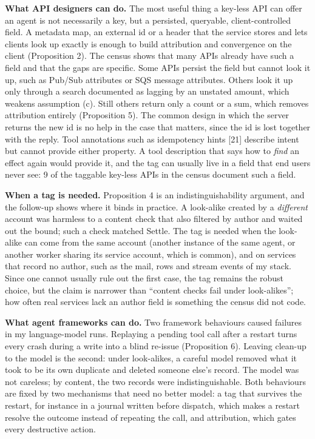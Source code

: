 \documentclass[
  10pt,
]{article}
\begin{document}
\textbf{What API designers can do.} The most useful thing a key-less API
can offer an agent is not necessarily a key, but a persisted, queryable,
client-controlled field. A metadata map, an external id or a header that
the service stores and lets clients look up exactly is enough to build
attribution and convergence on the client (Proposition 2). The census
shows that many APIs already have such a field and that the gaps are
specific. Some APIs persist the field but cannot look it up, such as
Pub/Sub attributes or SQS message attributes. Others look it up only
through a search documented as lagging by an unstated amount, which
weakens assumption (c). Still others return only a count or a sum, which
removes attribution entirely (Proposition 5). The common design in which
the server returns the new id is no help in the case that matters, since
the id is lost together with the reply. Tool annotations such as
idempotency hints {[}21{]} describe intent but cannot provide either
property. A tool description that says how to \emph{find} an effect
again would provide it, and the tag can usually live in a field that end
users never see: 9 of the taggable key-less APIs in the census document
such a field.

\textbf{When a tag is needed.} Proposition 4 is an indistinguishability
argument, and the follow-up shows where it binds in practice. A
look-alike created by a \emph{different} account was harmless to a
content check that also filtered by author and waited out the bound;
such a check matched Settle. The tag is needed when the look-alike can
come from the same account (another instance of the same agent, or
another worker sharing its service account, which is common), and on
services that record no author, such as the mail, rows and stream events
of my stack. Since one cannot usually rule out the first case, the tag
remains the robust choice, but the claim is narrower than ``content
checks fail under look-alikes''; how often real services lack an author
field is something the census did not code.

\textbf{What agent frameworks can do.} Two framework behaviours caused
failures in my language-model runs. Replaying a pending tool call after
a restart turns every crash during a write into a blind re-issue
(Proposition 6). Leaving clean-up to the model is the second: under
look-alikes, a careful model removed what it took to be its own
duplicate and deleted someone else's record. The model was not careless;
by content, the two records were indistinguishable. Both behaviours are
fixed by two mechanisms that need no better model: a tag that survives
the restart, for instance in a journal written before dispatch, which
makes a restart resolve the outcome instead of repeating the call, and
attribution, which gates every destructive action.
\end{document}
